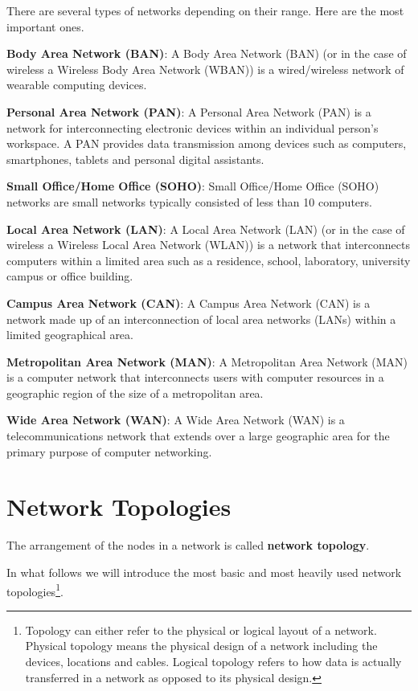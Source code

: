 There are several types of networks depending on their range. Here are the most important ones.
\bit
\item \textbf{Body Area Network (BAN)}: A Body Area Network (BAN) (or in the case of wireless a Wireless Body Area
Network (WBAN)) is a wired/wireless network of wearable computing devices.
\item \textbf{Personal Area Network (PAN)}: A Personal Area Network (PAN) is a network for interconnecting electronic
devices within an individual person's workspace. A PAN provides data transmission among devices such as computers,
smartphones, tablets and personal digital assistants.
\item \textbf{Small Office/Home Office (SOHO)}: Small Office/Home Office (SOHO) networks are small networks typically
consisted of less than 10 computers.
\item \textbf{Local Area Network (LAN)}: A Local Area Network (LAN) (or in the case of wireless a Wireless Local Area
Network (WLAN)) is a network that interconnects computers within a limited area such as a residence, school,
laboratory, university campus or office building.
\item \textbf{Campus Area Network (CAN)}: A Campus Area Network (CAN) is a network made up of an interconnection of
local area networks (LANs) within a limited geographical area.
\item \textbf{Metropolitan Area Network (MAN)}: A Metropolitan Area Network (MAN) is a computer network that
interconnects users with computer resources in a geographic region of the size of a metropolitan area.
\item \textbf{Wide Area Network (WAN)}: A Wide Area Network (WAN) is a telecommunications network that extends over a
large geographic area for the primary purpose of computer networking.
\eit


\section{Network Topologies}

The arrangement of the nodes in a network is called \textbf{network topology}.
\ed

In what follows we will introduce the most basic and most heavily used network topologies\footnote{Topology can
either refer to the physical or logical layout of a network. Physical topology means the physical design of a network
including the devices, locations and cables. Logical topology refers to how data is actually transferred in a network
as opposed to its physical design.}.

